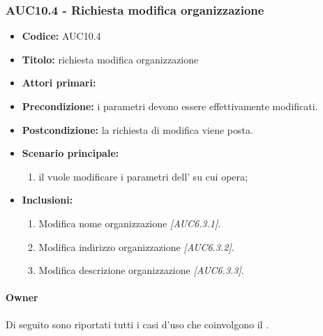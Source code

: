\documentclass[casi-duso]{subfiles}
\begin{document}
\subsubsection{AUC10.4 - Richiesta modifica organizzazione}%
\label{subsub:AUC10.4}
\begin{itemize}
  \item \textbf{Codice:} AUC10.4
  \item \textbf{Titolo:} richiesta modifica organizzazione
  \item \textbf{Attori primari:} 
  \item \textbf{Precondizione:} i parametri devono essere effettivamente modificati.
  \item \textbf{Postcondizione:} la richiesta di modifica viene posta.
  \item \textbf{Scenario principale:}
  \begin{enumerate}
    \item il  vuole modificare i parametri dell' su cui opera;
  \end{enumerate}
  \item \textbf{Inclusioni:}
  \begin{enumerate}
    \item Modifica nome organizzazione \emph{[AUC6.3.1]}.
    \item Modifica indirizzo organizzazione \emph{[AUC6.3.2]}.
    \item Modifica descrizione organizzazione \emph{[AUC6.3.3]}.
  \end{enumerate}
\end{itemize}

\paragraph{Owner}
Di seguito sono riportati tutti i casi d'uso che coinvolgono il  .
\end{document}
